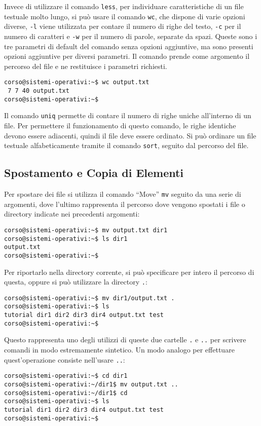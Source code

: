 \documentclass{article}
\numberwithin{equation}{subsection}
\begin{document}
Invece di utilizzare il comando \verb|less|, per individuare caratteristiche di un file testuale molto lungo, si può usare il comando \verb|wc|, che dispone di varie opzioni diverse, \verb|-l| viene utilizzata 
per contare il numero di righe del testo, \verb|-c| per il numero di caratteri e \verb|-w| per il numero di parole, separate da spazi. Queste sono i tre parametri di default del comando senza opzioni aggiuntive, 
ma sono presenti opzioni aggiuntive per diversi parametri. Il comando prende come argomento il percorso del file e ne restituisce i parametri richiesti. 

\begin{verbatim}
corso@sistemi-operativi:~$ wc output.txt
 7 7 40 output.txt
corso@sistemi-operativi:~$
\end{verbatim}

Il comando \verb|uniq| permette di contare il numero di righe uniche all'interno di un file. Per permettere il funzionamento di questo comando, le righe identiche devono essere adiacenti, quindi il file deve essere 
ordinato. Si può ordinare un file testuale alfabeticamente tramite il comando \verb|sort|, seguito dal percorso del file. 

\subsection{Spostamento e Copia di Elementi}

Per spostare dei file si utilizza il comando ``Move'' \verb|mv| seguito da una serie di argomenti, dove l'ultimo rappresenta il percorso dove vengono spostati i file o directory indicate nei precedenti argomenti:
\begin{verbatim}
corso@sistemi-operativi:~$ mv output.txt dir1
corso@sistemi-operativi:~$ ls dir1
output.txt
corso@sistemi-operativi:~$
\end{verbatim}
Per riportarlo nella directory corrente, si può specificare per intero il percorso di questa, oppure si può utilizzare la directory \verb|.|:
\begin{verbatim}
corso@sistemi-operativi:~$ mv dir1/output.txt .
corso@sistemi-operativi:~$ ls 
tutorial dir1 dir2 dir3 dir4 output.txt test
corso@sistemi-operativi:~$
\end{verbatim}
Questo rappresenta uno degli utilizzi di queste due cartelle \verb|.| e \verb|..| per scrivere comandi in modo estremamente sintetico. 
Un modo analogo per effettuare quest'operazione consiste nell'usare \verb|..|:
\begin{verbatim}
corso@sistemi-operativi:~$ cd dir1
corso@sistemi-operativi:~/dir1$ mv output.txt ..
corso@sistemi-operativi:~/dir1$ cd
corso@sistemi-operativi:~$ ls 
tutorial dir1 dir2 dir3 dir4 output.txt test
corso@sistemi-operativi:~$
\end{verbatim}
\end{document}
